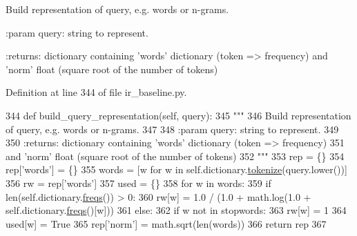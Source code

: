 \begin{DoxyVerb}Build representation of query, e.g. words or n-grams.

:param query: string to represent.

:returns: dictionary containing 'words' dictionary (token => frequency)
  and 'norm' float (square root of the number of tokens)
\end{DoxyVerb}
 

Definition at line 344 of file ir\+\_\+baseline.\+py.


\begin{DoxyCode}
344     \textcolor{keyword}{def }build\_query\_representation(self, query):
345         \textcolor{stringliteral}{"""}
346 \textcolor{stringliteral}{        Build representation of query, e.g. words or n-grams.}
347 \textcolor{stringliteral}{}
348 \textcolor{stringliteral}{        :param query: string to represent.}
349 \textcolor{stringliteral}{}
350 \textcolor{stringliteral}{        :returns: dictionary containing 'words' dictionary (token => frequency)}
351 \textcolor{stringliteral}{                  and 'norm' float (square root of the number of tokens)}
352 \textcolor{stringliteral}{        """}
353         rep = \{\}
354         rep[\textcolor{stringliteral}{'words'}] = \{\}
355         words = [w \textcolor{keywordflow}{for} w \textcolor{keywordflow}{in} self.dictionary.\hyperlink{namespaceparlai_1_1agents_1_1tfidf__retriever_1_1build__tfidf_a1fdb457e98eb4e4c26047e229686a616}{tokenize}(query.lower())]
356         rw = rep[\textcolor{stringliteral}{'words'}]
357         used = \{\}
358         \textcolor{keywordflow}{for} w \textcolor{keywordflow}{in} words:
359             \textcolor{keywordflow}{if} len(self.dictionary.\hyperlink{namespaceparlai_1_1agents_1_1tfidf__retriever_1_1build__tfidf_a82fd1621e57caaa8ff7a9c27b0e94125}{freqs}()) > 0:
360                 rw[w] = 1.0 / (1.0 + math.log(1.0 + self.dictionary.\hyperlink{namespaceparlai_1_1agents_1_1tfidf__retriever_1_1build__tfidf_a82fd1621e57caaa8ff7a9c27b0e94125}{freqs}()[w]))
361             \textcolor{keywordflow}{else}:
362                 \textcolor{keywordflow}{if} w \textcolor{keywordflow}{not} \textcolor{keywordflow}{in} stopwords:
363                     rw[w] = 1
364             used[w] = \textcolor{keyword}{True}
365         rep[\textcolor{stringliteral}{'norm'}] = math.sqrt(len(words))
366         \textcolor{keywordflow}{return} rep
367 \end{DoxyCode}
\mbox{\label{classparlai_1_1agents_1_1ir__baseline_1_1ir__baseline_1_1IrBaselineAgent_a3701001e1de9bcc2d110a318799101c1}} 
